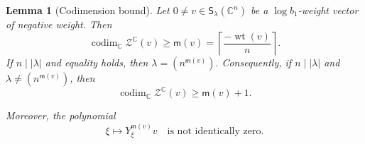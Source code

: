 \documentclass[reqno,11pt]{amsart}
\numberwithin{equation}{section}
\newtheorem{lemma}[theorem]{Lemma}
\theoremstyle{definition}
\theoremstyle{remark}
\begin{document}
\begin{lemma}[Codimension bound]
\label{lem:codimensionbound}
Let $0\ne v\in\mathsf S_\lambda(\mathbb C^n)$ be a
$\log b_1$-weight vector of negative weight. Then
\begin{equation}\label{eq:kernel-weight-bound}
\operatorname{codim}_{\mathbb C}\mathcal Z^{\mathbb C}(v)
\ge
\mathsf m(v)
=
\left\lceil\frac{-\operatorname{wt}(v)}{n}\right\rceil.
\end{equation}
If $n\mid|\lambda|$ and equality holds, then
$\lambda=(n^{\mathsf m(v)}).
$
Consequently, if $n\mid|\lambda|$ and
$\lambda\ne(n^{\mathsf m(v)})$, then
$$
\operatorname{codim}_{\mathbb C}\mathcal Z^{\mathbb C}(v)
\ge\mathsf m(v)+1.
$$

Moreover, the polynomial
\begin{equation}\label{eq:critical-power-nonzero}
\xi\mapsto Y_\xi^{\mathsf m(v)}v
\quad\text{is not identically zero}.
\end{equation}
\end{lemma}
\end{document}
